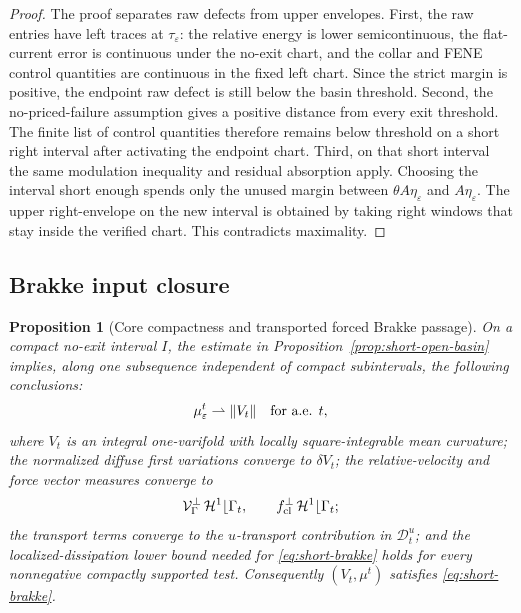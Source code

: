 \documentclass[11pt]{article}
\newtheorem{proposition}[theorem]{Proposition}
\theoremstyle{definition}
\newcommand{\eps}{\varepsilon}
\newcommand{\Vrel}{\mathcal V}
\newcommand{\Hh}{\mathcal H}
\begin{document}
\begin{proof}
The proof separates raw defects from upper envelopes.  First, the raw entries
have left traces at \(\tau_\eps\): the relative energy is lower semicontinuous,
the flat-current error is continuous under the no-exit chart, and the collar
and FENE control quantities are continuous in the fixed left chart.  Since the strict
margin is positive, the endpoint raw defect is still below the basin threshold.
Second, the no-priced-failure assumption gives a positive distance from every
exit threshold.  The finite list of control quantities therefore remains below threshold
on a short right interval after activating the endpoint chart.  Third, on that
short interval the same modulation inequality and residual absorption apply.
Choosing the interval short enough spends only the unused margin between
\(\theta A\eta_\eps\) and \(A\eta_\eps\).  The upper right-envelope on the new
interval is obtained by taking right windows that stay inside the verified
chart.  This contradicts maximality.
\end{proof}

\subsection{Brakke input closure}

\begin{proposition}[Core compactness and transported forced Brakke passage]
\label{prop:short-brakke}
On a compact no-exit interval \(I\), the estimate in
Proposition~\ref{prop:short-open-basin} implies, along one subsequence
independent of compact subintervals, the following conclusions:
\[
        \mu_\eps^t\rightharpoonup\|V_t\|
        \quad\hbox{for a.e. }t,
\]
where \(V_t\) is an integral one-varifold with locally square-integrable mean
curvature; the normalized diffuse first variations converge to \(\delta V_t\);
the relative-velocity and force vector measures converge to
\[
        \Vrel_\Gamma^\perp\,\Hh^1\lfloor\Gamma_t,
        \qquad
        f_{\rm cl}^\perp\,\Hh^1\lfloor\Gamma_t;
\]
the transport terms converge to the \(u\)-transport contribution in
\(\mathcal D_t^u\); and the localized-dissipation lower bound needed for
\eqref{eq:short-brakke} holds for every nonnegative compactly supported test.
Consequently \((V_t,\mu^t)\) satisfies \eqref{eq:short-brakke}.
\end{proposition}
\end{document}
